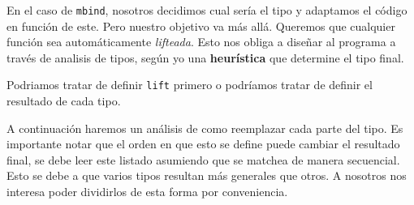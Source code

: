 En el caso de \lstinline{mbind}, nosotros decidimos cual sería el tipo y adaptamos el
código en función de este. Pero nuestro objetivo va más allá. Queremos que
cualquier función sea automáticamente \textit{lifteada}. Esto nos obliga a
diseñar al programa a través de analisis de tipos, según yo una
\textbf{heurística} que determine el tipo final.

Podriamos tratar de definir \lstinline{lift} primero o podríamos tratar de definir el
resultado de cada tipo.

A continuación haremos un análisis de como reemplazar cada parte del tipo. Es
importante notar que el orden en que esto se define puede cambiar el resultado
final, se debe leer este listado asumiendo que se matchea de manera secuencial.
Esto se debe a que varios tipos resultan más generales que otros. A nosotros nos
interesa poder dividirlos de esta forma por conveniencia.

